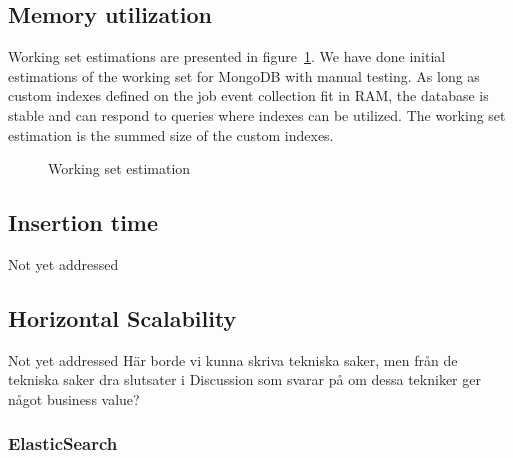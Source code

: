 \subsection{Memory utilization}
Working set estimations are presented in figure~\ref{fig:ws}. We have done initial estimations of the working set for MongoDB with manual testing. As long as custom indexes defined on the job event collection fit in RAM, the database is stable and can respond to queries where indexes can be utilized. The working set estimation is the summed size of the custom indexes.
\begin{figure}[h!]
\centering
{}
\caption{Working set estimation}
\label{fig:ws}
\end{figure}
\subsection{Insertion time}
Not yet addressed
\subsection{Horizontal Scalability}
Not yet addressed
Här borde vi kunna skriva tekniska saker, men från de tekniska saker dra slutsater i Discussion som svarar på om dessa tekniker ger något business value?
\subsubsection{ElasticSearch}